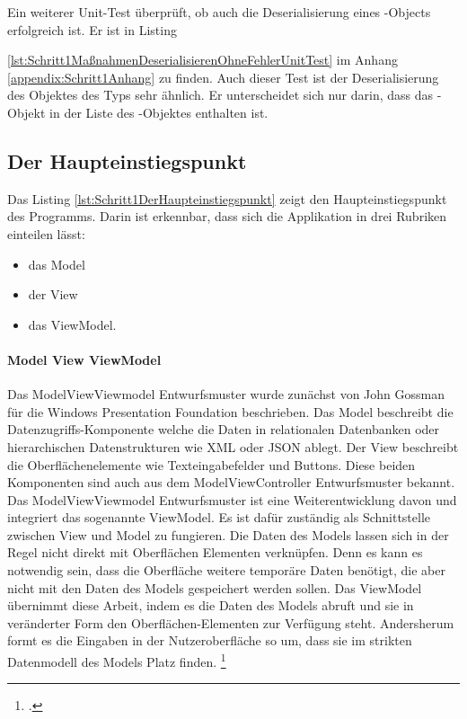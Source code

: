 Ein weiterer Unit-Test überprüft, ob auch die Deserialisierung eines -Objects erfolgreich ist. Er ist in Listing {\ref{lst:Schritt1MaßnahmenDeserialisierenOhneFehlerUnitTest} im Anhang \ref{appendix:Schritt1Anhang} zu finden.
Auch dieser Test ist der Deserialisierung des Objektes des Typs  sehr ähnlich. Er unterscheidet sich nur darin, dass das -Objekt in der Liste  des -Objektes  enthalten ist.

\subsection{Der Haupteinstiegspunkt}

Das Listing \ref{lst:Schritt1DerHaupteinstiegspunkt} zeigt den Haupteinstiegspunkt des Programms. Darin ist erkennbar, dass sich die Applikation in drei Rubriken einteilen lässt:
\begin{itemize}
  \item das Model 
  \item der View 
  \item das ViewModel. 
\end{itemize}
\paragraph{Model View ViewModel}
Das ModelViewViewmodel Entwurfsmuster wurde zunächst von John Gossman für die Windows Presentation Foundation beschrieben.
Das Model beschreibt die Datenzugriffs-Komponente welche die Daten in relationalen Datenbanken oder hierarchischen Datenstrukturen wie XML oder JSON ablegt. Der View beschreibt die Oberflächenelemente wie Texteingabefelder und Buttons. Diese beiden Komponenten sind auch aus dem ModelViewController Entwurfsmuster bekannt. Das ModelViewViewmodel Entwurfsmuster ist eine Weiterentwicklung davon und integriert das sogenannte ViewModel. Es ist dafür zuständig als Schnittstelle zwischen View und Model zu fungieren. Die Daten des Models lassen sich in der Regel nicht direkt mit Oberflächen Elementen verknüpfen. Denn es kann es notwendig sein, dass die Oberfläche weitere temporäre Daten benötigt, die aber nicht mit den Daten des Models gespeichert werden sollen. Das ViewModel übernimmt diese Arbeit, indem es die Daten des Models abruft und sie in veränderter Form den Oberflächen-Elementen zur Verfügung steht. Andersherum formt es die Eingaben in der Nutzeroberfläche so um, dass sie im strikten Datenmodell des Models Platz finden. \footcite[Vgl.][]{IntroductionToModelViewViewModelPatternForBuildingWPFApps}

}

